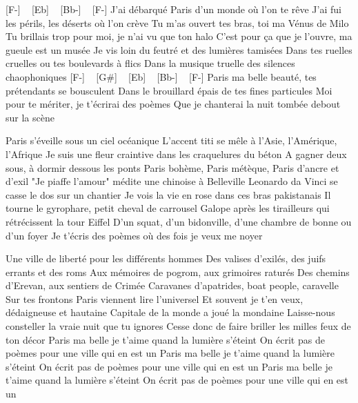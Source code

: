 
[F-] ~ [Eb] ~ [Bb-] ~ [F-]
J'ai débarqué Paris d'un monde où l'on te rêve
J'ai fui les périls, les déserts où l'on crève
Tu m'as ouvert tes bras, toi ma Vénus de Milo
Tu brillais trop pour moi, je n'ai vu que ton halo
C'est pour ça que je l'ouvre, ma gueule est un musée
Je vis loin du feutré et des lumières tamisées
Dans tes ruelles cruelles ou tes boulevards à flics
Dans la musique truelle des silences chaophoniques
[F-] ~ [G#] ~ [Eb] ~ [Bb-] ~ [F-]
Paris ma belle beauté, tes prétendants se bousculent
Dans le brouillard épais de tes fines particules
Moi pour te mériter, je t'écrirai des poèmes
Que je chanterai la nuit tombée debout sur la scène


Paris s'éveille sous un ciel océanique
L'accent titi se mêle à l'Asie, l'Amérique, l'Afrique
Je suis une fleur craintive dans les craquelures du béton
A gagner deux sous, à dormir dessous les ponts
Paris bohème, Paris métèque, Paris d'ancre et d'exil
"Je piaffe l'amour" médite une chinoise à Belleville
Leonardo da Vinci se casse le dos sur un chantier
Je vois la vie en rose dans ces bras pakistanais
Il tourne le gyrophare, petit cheval de carrousel
Galope après les tirailleurs qui rétrécissent la tour Eiffel
D'un squat, d'un bidonville, d'une chambre de bonne ou d'un foyer
Je t'écris des poèmes où des fois je veux me noyer


Une ville de liberté pour les différents hommes
Des valises d'exilés, des juifs errants et des roms
Aux mémoires de pogrom, aux grimoires raturés
Des chemins d'Erevan, aux sentiers de Crimée
Caravanes d'apatrides, boat people, caravelle
Sur tes frontons Paris viennent lire l'universel
Et souvent je t'en veux, dédaigneuse et hautaine
Capitale de la monde a joué la mondaine
Laisse-nous consteller la vraie nuit que tu ignores
Cesse donc de faire briller les milles feux de ton décor
Paris ma belle je t'aime quand la lumière s'éteint
On écrit pas de poèmes pour une ville qui en est un
Paris ma belle je t'aime quand la lumière s'éteint
On écrit pas de poèmes pour une ville qui en est un
Paris ma belle je t'aime quand la lumière s'éteint
On écrit pas de poèmes pour une ville qui en est un